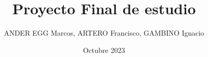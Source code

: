 \documentclass[12pt,a4paper,oneside]{book}
\title{Proyecto Final de estudio }
\author{ANDER EGG Marcos, ARTERO Francisco, GAMBINO Ignacio}
\date{Octubre 2023}
\begin{document}

\marginsize{3.0cm}{3.0cm}{4.0cm}{3.0cm}
\renewcommand*{\contentsname}{ÍNDICE}
\renewcommand*{\listtablename}{Índice de tablas}
\renewcommand*{\listfigurename}{Índice de figuras}
\renewcommand{\baselinestretch}{1.0}
\renewcommand{\appendixname}{Anexos}
\renewcommand{\appendixtocname}{Anexos}
\renewcommand{\appendixpagename}{Anexos}
\renewcommand{\thetable}{\arabic{chapter}.\arabic{table}}
\renewcommand*{\tablename}{Tabla}
\renewcommand*{\chaptername}{Capítulo}
\renewcommand*{\thechapter}{\Roman{chapter}}
\renewcommand{\thesection}{\arabic{chapter}.\arabic{section}}
\renewcommand{\figurename}{Figura}
\renewcommand{\thefigure}{\arabic{chapter}.\arabic{figure}}
\renewcommand{\theequation}{\arabic{chapter}.\arabic{equation}}



\end{document}
